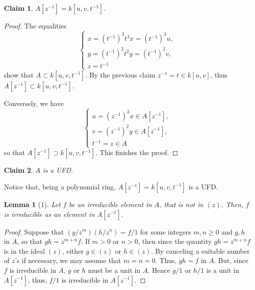 \documentclass[11pt]{amsart}          %
\newcommand{\tuborg}{\left\{\begin{array}{ll}}
\newcommand{\sluttuborg}{\end{array}\right.}
\newtheorem*{lemma}{Lemma}
\newtheorem*{claim}{Claim}
\begin{document}
\begin{claim} $A[z^{-1}] = k[u,v, t^{-1}]$.\end{claim}
\begin{proof} The equalities
$$\tuborg x  = (t^{-1})^3 t^3 x = (t^{-1})^3 u, \\    y= (t^{-1} )^2 t^2 y = (t^{-1})^2 v, \\   z= t^{-1} \sluttuborg$$ show that $A \subset k[u,v, t^{-1}]$. By the previous claim $z^{-1} = t \in k[u,v]$, thus $A[z^{-1}] \subset k[u,v, t^{-1}]$.

Conversely, we have
$$\tuborg u = (z^{-1})^3 x \in A[z^{-1}], \\  v = (z^{-1})^2 y \in A[z^{-1}], \\ t^{-1} = z \in A\sluttuborg$$ so that $A[z^{-1}] \supset k[u,v, t^{-1}]$. This finishes the proof.\end{proof}

\begin{claim} $A$ is a UFD.\end{claim} Notice that, being a polynomial ring, $A[z^{-1}] = k[u,v, t^{-1}]$ is a UFD.
\begin{lemma}[1] Let $f $ be an irreducible element in $A$, that is not in $(z)$. Then, $f$ is irreducible as an element in $A[z^{-1}]$.
\end{lemma}
\begin{proof}Suppose that $(g/ z^m) (h/z^n) = f/1$ for some integers $m, n \geq 0$ and $g, h$ in $A$, so that $gh = z^{m+n} f$. If $m>0$ or $n >0$, then since the quantity $gh = z^{m+n } f$ is in the ideal $ (z)$, either $g \in (z)$ or $h \in (z)$. By canceling a suitable number of $z$'s if necessary, we may assume that $m = n = 0$. Thus, $gh = f$ in $A$. But, since $f$ is irreducible in $A$, $g$ or $h$ must be a unit in $A$. Hence $g/1$ or $h/1$ is a unit in $A[z^{-1}]$, thus, $f/1$ is irreducible in $A[z^{-1}]$.\end{proof}
\end{document}
